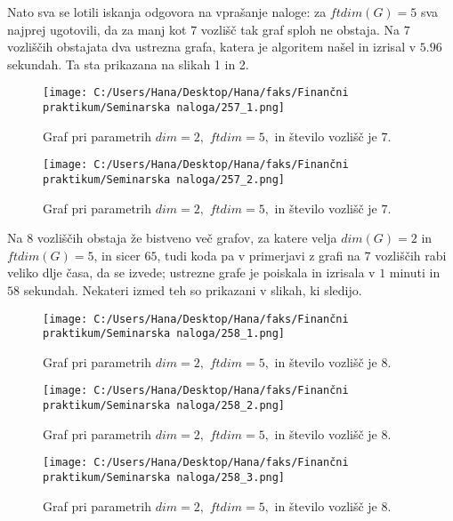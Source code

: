 \documentclass[12pt]{article}
\begin{document}
Nato sva se lotili iskanja odgovora na vprašanje naloge: za $ftdim(G) = 5$ sva najprej ugotovili, da za manj kot $7$ 
vozlišč tak graf sploh ne obstaja. Na $7$ vozliščih obstajata dva ustrezna grafa, katera je algoritem našel in izrisal v 
$5.96$ sekundah. Ta sta prikazana na slikah 1 in 2.

\begin{figure}[H]
    \centering
    \texttt{[image: C:/Users/Hana/Desktop/Hana/faks/Finančni praktikum/Seminarska naloga/257\_1.png]}
    \caption{Graf pri parametrih $dim = 2,$ $ftdim = 5,$ in število vozlišč je $7.$}
    \label{fig:slika257_1}
\end{figure}

\begin{figure}[H]
    \centering
    \texttt{[image: C:/Users/Hana/Desktop/Hana/faks/Finančni praktikum/Seminarska naloga/257\_2.png]}
    \caption{Graf pri parametrih $dim = 2,$ $ftdim = 5,$ in število vozlišč je $7.$}
    \label{fig:slika257_2}
\end{figure}

Na $8$ vozliščih obstaja že bistveno več grafov, za katere velja $dim(G) = 2$ in $ftdim(G) = 5$, in sicer $65$, tudi koda 
pa v primerjavi z grafi na $7$ vozliščih rabi veliko dlje časa, da se izvede; ustrezne grafe je poiskala in izrisala v $1$ 
minuti in $58$ sekundah. Nekateri izmed teh so prikazani v slikah, ki sledijo.

\begin{figure}[H]
    \centering
    \texttt{[image: C:/Users/Hana/Desktop/Hana/faks/Finančni praktikum/Seminarska naloga/258\_1.png]}
    \caption{Graf pri parametrih $dim = 2,$ $ftdim = 5,$ in število vozlišč je $8.$}
    \label{fig:slika258_1}
\end{figure}

\begin{figure}[H]
    \centering
    \texttt{[image: C:/Users/Hana/Desktop/Hana/faks/Finančni praktikum/Seminarska naloga/258\_2.png]}
    \caption{Graf pri parametrih $dim = 2,$ $ftdim = 5,$ in število vozlišč je $8.$}
    \label{fig:slika258_2}
\end{figure}

\begin{figure}[H]
    \centering
    \texttt{[image: C:/Users/Hana/Desktop/Hana/faks/Finančni praktikum/Seminarska naloga/258\_3.png]}
    \caption{Graf pri parametrih $dim = 2,$ $ftdim = 5,$ in število vozlišč je $8.$}
    \label{fig:slika258_3}
\end{figure}
\end{document}

